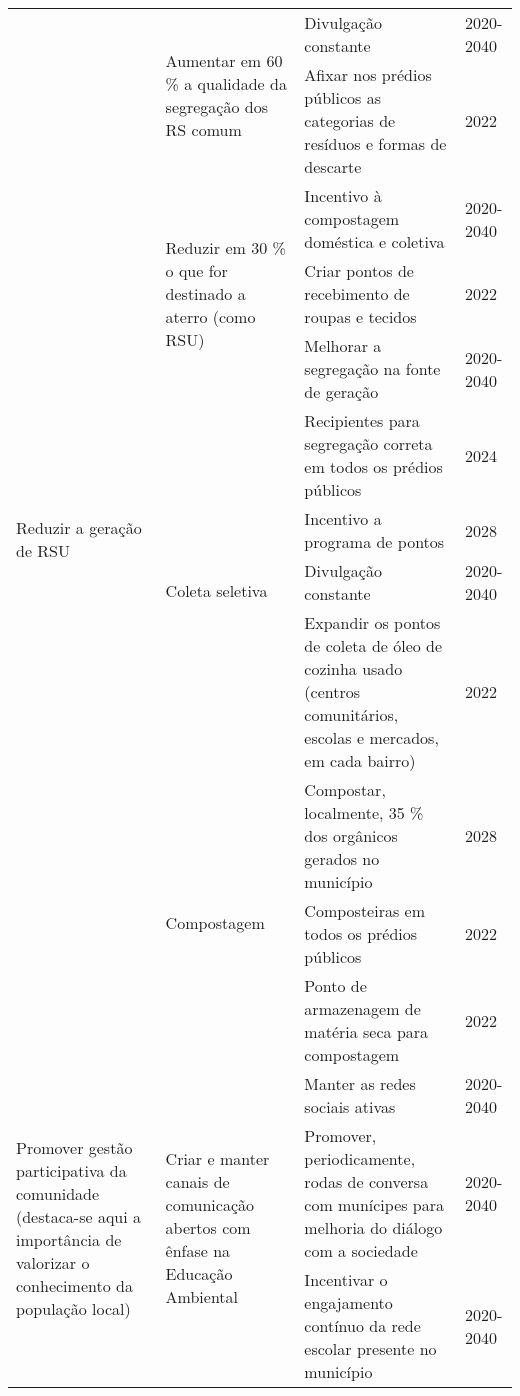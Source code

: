 \begin{center}
\begin{longtable}{|p{}|p{}|p{}|p{}|}
		\multirow{12}[24]{*}{Reduzir a geração de RSU} & \multirow{2}[4]{*}{Aumentar em 60 \% a qualidade da segregação dos RS comum} & Divulgação constante & 2020-2040 \\
		\cmidrule{3-4}          &       & Afixar nos prédios públicos as categorias de resíduos e formas de descarte & 2022 \\
		\cmidrule{2-4}          & \multirow{3}[6]{*}{Reduzir em 30 \% o que for destinado a aterro (como RSU)} & Incentivo à compostagem doméstica e coletiva & 2020-2040 \\
		\cmidrule{3-4}          &       & Criar pontos de recebimento de roupas e tecidos & 2022 \\
		\cmidrule{3-4}          &       & Melhorar a segregação na fonte de geração & 2020-2040 \\
		\cmidrule{2-4}          & \multirow{4}[8]{*}{Coleta seletiva} & Recipientes para segregação correta em todos os prédios públicos & 2024 \\
		\cmidrule{3-4}          &       & Incentivo a programa de pontos & 2028 \\
		\cmidrule{3-4}          &       & Divulgação constante & 2020-2040 \\
		\cmidrule{3-4}          &       & Expandir os pontos de coleta de óleo de cozinha usado (centros comunitários, escolas e mercados, em cada bairro) & 2022 \\
		\cmidrule{2-4}          & \multirow{3}[6]{*}{Compostagem} & Compostar, localmente, 35 \% dos orgânicos gerados no município & 2028 \\
		\cmidrule{3-4}          &       & Composteiras em todos os prédios públicos & 2022 \\
		\cmidrule{3-4}          &       & Ponto de armazenagem de matéria seca para compostagem & 2022 \\
		\midrule
		\multirow{5}[10]{*}{Promover gestão participativa da comunidade (destaca-se aqui a importância de valorizar o conhecimento da população local)} & \multirow{5}[10]{*}{Criar e manter canais de comunicação abertos com ênfase na Educação Ambiental} & Manter as redes sociais ativas & 2020-2040 \\
		\cmidrule{3-4}          &       & Promover, periodicamente, rodas de conversa com munícipes para melhoria do diálogo com a sociedade & 2020-2040 \\
		\cmidrule{3-4}          &       & Incentivar o engajamento contínuo da rede escolar presente no município & 2020-2040 \\

\end{longtable}
\end{center}
